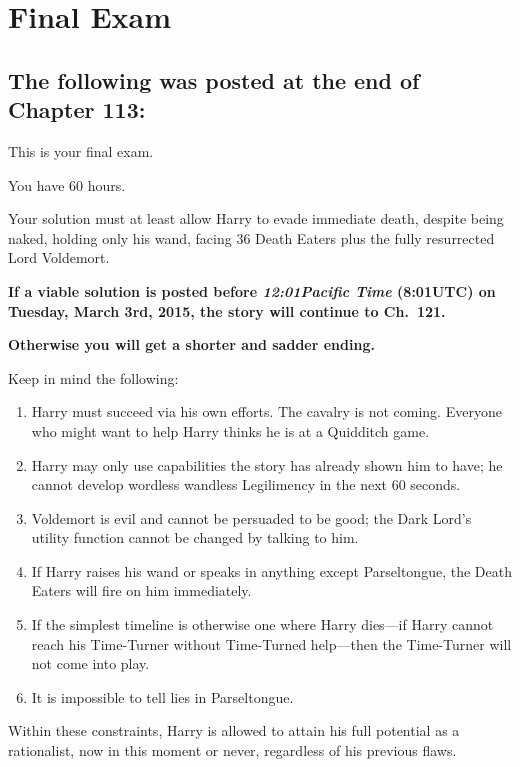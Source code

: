 \chapter{Final Exam}

\section{The following was posted at the end of Chapter 113:}

{\setlength{\parindent}{0pt}
\setlength{\parskip}{.5\baselineskip}

This is your final exam.

You have 60 hours.

Your solution must at least allow Harry to evade immediate death,
despite being naked, holding only his wand, facing 36 Death Eaters
plus the fully resurrected Lord Voldemort.

\textbf{If a viable solution is posted before \emph{12:01\am Pacific Time} (8:01\am UTC) on Tuesday, March 3rd, 2015, the story will continue to Ch.~121.}

\textbf{Otherwise you will get a shorter and sadder ending.}

Keep in mind the following:
\begin{enumerate}
\item Harry must succeed via his own efforts. The cavalry is not coming.
Everyone who might want to help Harry thinks he is at a Quidditch game.
\item Harry may only use capabilities the story has already shown him to
have; he cannot develop wordless wandless Legilimency in the next 60 seconds.
\item Voldemort is evil and cannot be persuaded to be good; the Dark Lord’s utility function cannot be changed by talking to him.
\item If Harry raises his wand or speaks in anything except Parseltongue, the Death Eaters will fire on him immediately.
\item If the simplest timeline is otherwise one where Harry dies—if Harry cannot reach his Time-Turner without Time-Turned help—then the Time-Turner will not come into play.
\item It is impossible to tell lies in Parseltongue.
\end{enumerate}
{\setlength{\parindent}{0pt}
\setlength{\parskip}{.5\baselineskip}
Within these constraints, Harry is allowed to attain his full potential as a rationalist, now in this moment or never, regardless of his previous flaws.

}}

